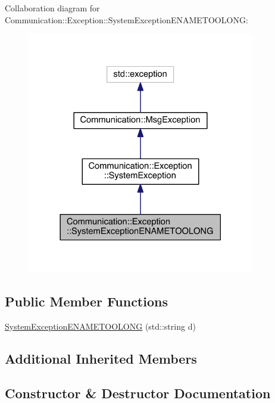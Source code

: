 Collaboration diagram for Communication\+:\+:Exception\+:\+:System\+Exception\+E\+N\+A\+M\+E\+T\+O\+O\+L\+O\+N\+G\+:\nopagebreak
\begin{figure}[H]
\begin{center}
\leavevmode
\includegraphics[width=282pt]{class_communication_1_1_exception_1_1_system_exception_e_n_a_m_e_t_o_o_l_o_n_g__coll__graph}
\end{center}
\end{figure}
\subsection*{Public Member Functions}
\begin{DoxyCompactItemize}
\item 
\hyperlink{class_communication_1_1_exception_1_1_system_exception_e_n_a_m_e_t_o_o_l_o_n_g_a55873a61820f58535e6065c5c099800b}{System\+Exception\+E\+N\+A\+M\+E\+T\+O\+O\+L\+O\+N\+G} (std\+::string d)
\end{DoxyCompactItemize}
\subsection*{Additional Inherited Members}


\subsection{Constructor \& Destructor Documentation}
\hypertarget{class_communication_1_1_exception_1_1_system_exception_e_n_a_m_e_t_o_o_l_o_n_g_a55873a61820f58535e6065c5c099800b}{}
